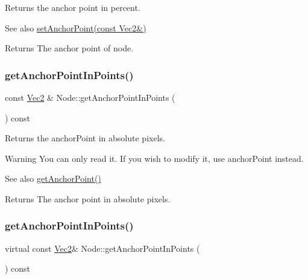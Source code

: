 Returns the anchor point in percent.

\begin{DoxySeeAlso}{See also}
{\ttfamily \hyperlink{classNode_a4dd45cb48a51df7c257675f527e3f277}{set\+Anchor\+Point(const Vec2\&)}}
\end{DoxySeeAlso}
\begin{DoxyReturn}{Returns}
The anchor point of node. 
\end{DoxyReturn}
\mbox{\label{classNode_a288b900788ed2db5eddb9d84751a3602}} 
\subsubsection{\texorpdfstring{get\+Anchor\+Point\+In\+Points()}{getAnchorPointInPoints()}\hspace{0.1cm}{\footnotesize\ttfamily [1/2]}}
{\footnotesize\ttfamily const \hyperlink{classVec2}{Vec2} \& Node\+::get\+Anchor\+Point\+In\+Points (\begin{DoxyParamCaption}{ }\end{DoxyParamCaption}) const\hspace{0.3cm}{\ttfamily [virtual]}}

Returns the anchor\+Point in absolute pixels.

\begin{DoxyWarning}{Warning}
You can only read it. If you wish to modify it, use anchor\+Point instead. 
\end{DoxyWarning}
\begin{DoxySeeAlso}{See also}
{\ttfamily \hyperlink{classNode_a391027410f7f45889938090feb631cba}{get\+Anchor\+Point()}}
\end{DoxySeeAlso}
\begin{DoxyReturn}{Returns}
The anchor point in absolute pixels. 
\end{DoxyReturn}
\mbox{\label{classNode_a3a34e8bc876a6c391a31e8263237f844}} 
\subsubsection{\texorpdfstring{get\+Anchor\+Point\+In\+Points()}{getAnchorPointInPoints()}\hspace{0.1cm}{\footnotesize\ttfamily [2/2]}}
{\footnotesize\ttfamily virtual const \hyperlink{classVec2}{Vec2}\& Node\+::get\+Anchor\+Point\+In\+Points (\begin{DoxyParamCaption}{ }\end{DoxyParamCaption}) const\hspace{0.3cm}{\ttfamily [virtual]}}


